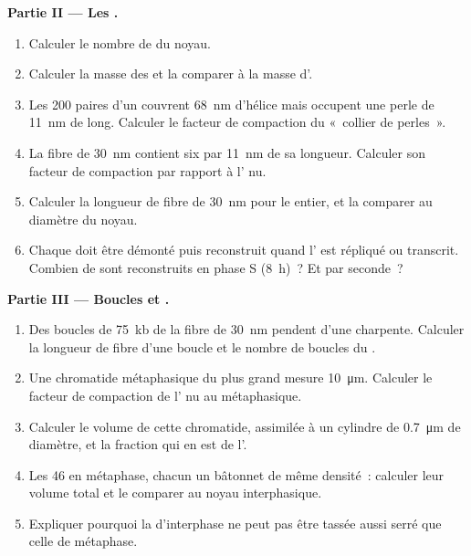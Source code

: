 \begin{problem}
\medskip
\noindent\textbf{Partie II --- Les .}
\begin{enumerate}[resume]
  \item Calculer le nombre de  du noyau.
  \item Calculer la masse des  et la comparer à la masse d'.
  \item Les \qty{200}{} paires d'un  couvrent \qty{68}{nm}
        d'hélice mais occupent une perle de \qty{11}{nm} de long.
        Calculer le facteur de compaction du «~collier de perles~».
  \item La fibre de \qty{30}{nm} contient six  par
        \qty{11}{nm} de sa longueur. Calculer son facteur de compaction
        par rapport à l' nu.
  \item Calculer la longueur de fibre de \qty{30}{nm} pour le 
        entier, et la comparer au diamètre du noyau.
  \item Chaque  doit être démonté puis reconstruit quand l'
        est répliqué ou transcrit. Combien de  sont
        reconstruits en phase S (\qty{8}{h})~? Et par seconde~?
\end{enumerate}

\medskip
\noindent\textbf{Partie III --- Boucles et .}
\begin{enumerate}[resume]
  \item Des boucles de \qty{75}{kb} de la fibre de \qty{30}{nm} pendent
        d'une charpente. Calculer la longueur de fibre d'une boucle et
        le nombre de boucles du .
  \item Une chromatide métaphasique du plus grand  mesure
        \qty{10}{\micro m}. Calculer le facteur de compaction de l'
        nu au  métaphasique.
  \item Calculer le volume de cette chromatide, assimilée à un cylindre
        de \qty{0.7}{\micro m} de diamètre, et la fraction qui en est de
        l'.
  \item Les 46  en métaphase, chacun un bâtonnet de même
        densité~: calculer leur volume total et le comparer au noyau
        interphasique.
  \item Expliquer pourquoi la  d'interphase ne peut pas être
        tassée aussi serré que celle de métaphase.
\end{enumerate}


\end{problem}
